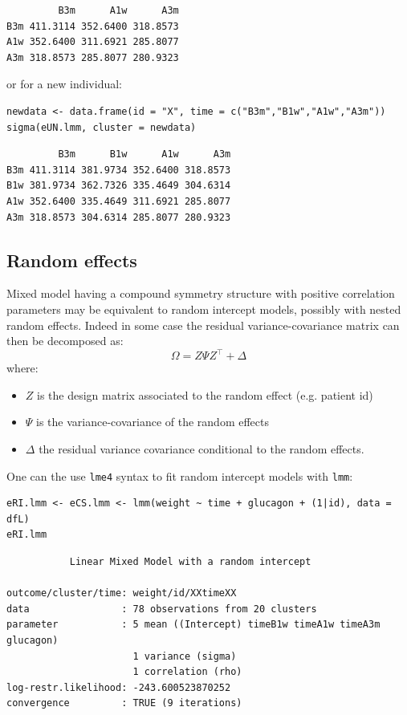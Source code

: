 \documentclass[12pt]{article}
\newcommand\trans[1]{{#1}^\intercal}%
\begin{document}
\begin{verbatim}
         B3m      A1w      A3m
B3m 411.3114 352.6400 318.8573
A1w 352.6400 311.6921 285.8077
A3m 318.8573 285.8077 280.9323
\end{verbatim}


or for a new individual:
\lstset{language=r,label= ,caption= ,captionpos=b,numbers=none}
\begin{lstlisting}
newdata <- data.frame(id = "X", time = c("B3m","B1w","A1w","A3m"))
sigma(eUN.lmm, cluster = newdata)
\end{lstlisting}

\begin{verbatim}
         B3m      B1w      A1w      A3m
B3m 411.3114 381.9734 352.6400 318.8573
B1w 381.9734 362.7326 335.4649 304.6314
A1w 352.6400 335.4649 311.6921 285.8077
A3m 318.8573 304.6314 285.8077 280.9323
\end{verbatim}

\subsection{Random effects}
\label{sec:org7a62df5}

Mixed model having a compound symmetry structure with positive
correlation parameters may be equivalent to random intercept models,
possibly with nested random effects. Indeed in some case the residual
variance-covariance matrix can then be decomposed as:
\[ \Omega = Z \Psi \trans{Z} + \Delta \]
where:
\begin{itemize}
\item \(Z\) is the design matrix associated to the random effect (e.g. patient id)
\item \(\Psi\) is the variance-covariance of the random effects
\item \(\Delta\) the residual variance covariance conditional to the random effects.
\end{itemize}
One can the use \texttt{lme4} syntax to fit random intercept models with
\texttt{lmm}:
\lstset{language=r,label= ,caption= ,captionpos=b,numbers=none}
\begin{lstlisting}
eRI.lmm <- eCS.lmm <- lmm(weight ~ time + glucagon + (1|id), data = dfL)
eRI.lmm
\end{lstlisting}

\begin{verbatim}
	       Linear Mixed Model with a random intercept 

outcome/cluster/time: weight/id/XXtimeXX 
data                : 78 observations from 20 clusters 
parameter           : 5 mean ((Intercept) timeB1w timeA1w timeA3m glucagon) 
                      1 variance (sigma) 
                      1 correlation (rho) 
log-restr.likelihood: -243.600523870252 
convergence         : TRUE (9 iterations)
\end{verbatim}
\end{document}
